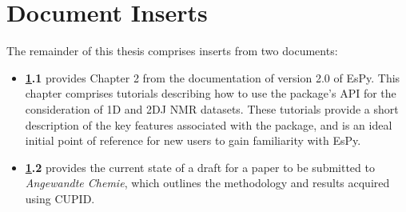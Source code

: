 \chapter{Document Inserts}
\label{chap:inserts}
The remainder of this thesis comprises inserts from two documents:
\begin{itemize}
    \item \textbf{\ref{chap:inserts}.1} provides Chapter 2 from the
        documentation of version 2.0 of \acs{EsPy}. This chapter comprises
        tutorials describing how to use the
        package's \ac{API} for the consideration of \ac{1D} and \ac{2DJ}
        \ac{NMR} datasets. These tutorials provide a short description of the
        key features associated with the package, and is an ideal
        initial point of reference for new users to gain familiarity with
        \ac{EsPy}.
    \item \textbf{\ref{chap:inserts}.2} provides the current state of a draft
        for a paper to be submitted to \textit{Angewandte Chemie}, which
        outlines the methodology and results acquired using \ac{CUPID}.
\end{itemize}

{}
{}


{}
{}


\cleardoublepage
{}
{}
\label{sec:cupid-draft}

